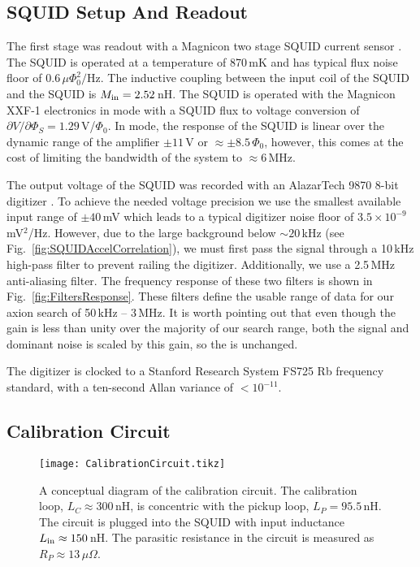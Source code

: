 \documentclass[aps,prd,amsmath,amssymb,reprint,superscriptaddress, nofootinbib,
]{revtex4-1}
\begin{document}
\subsection{SQUID Setup And Readout}
\label{sec:SQUIDReadout}


The first stage was readout with a Magnicon two stage SQUID current sensor \cite{Magnicon,Drung2007}. The SQUID is operated at a temperature of 870\,mK and has typical flux noise floor of $0.6\,\mu\Phi_0^2/\mathrm{Hz}$. The inductive coupling between the input coil of the SQUID and the SQUID is $M_{\rm in} = 2.52$\,nH. The SQUID is operated with the Magnicon XXF-1 electronics in \FLL mode with a SQUID flux to voltage conversion of $\partial V/\partial \Phi_S = 1.29$\,V/$\Phi_0$. In \FLL mode, the response of the SQUID is linear over the dynamic range of the amplifier $\pm11$\,V or $\approx\pm8.5\,\Phi_0$, however, this comes at the cost of limiting the bandwidth of the system to $\approx6$\,MHz. 

The output voltage of the SQUID was recorded with an AlazarTech 9870 8-bit digitizer \cite{AlazarTech}. To achieve the needed voltage precision we use the smallest available input range of $\pm40$\,mV which leads to a typical digitizer noise floor of $3.5\times10^{-9}$\,mV$^2$/Hz. However, due to the large background below $\sim20$\,kHz (see Fig.~\ref{fig:SQUIDAccelCorrelation}), we must first pass the signal through a 10\,kHz high-pass filter to prevent railing the digitizer. Additionally, we use a 2.5\,MHz anti-aliasing filter. The frequency response of these two filters is shown in Fig.~\ref{fig:FiltersResponse}. These filters define the usable range of data for our axion search of 50\,kHz -- 3\,MHz. It is worth pointing out that even though the gain is less than unity over the majority of our search range, both the signal and dominant noise is scaled by this gain, so the \SNR is unchanged. 

The digitizer is clocked to a Stanford Research System FS725 Rb frequency standard, with a ten-second Allan variance of $<10^{-11}$.

\subsection{Calibration Circuit}
\label{sec:CalibrationLoop}

\begin{figure}
\texttt{[image: CalibrationCircuit.tikz]}
\caption{A conceptual diagram of the \abra calibration circuit. The calibration loop, $L_C\approx300$\,nH, is concentric with the pickup loop, $L_P=95.5$\,nH. The circuit is plugged into the SQUID with input inductance $L_{\rm in}\approx150$\,nH. The parasitic resistance in the circuit is measured as $R_P\approx13\,\mu\Omega$.}
\label{fig:CalibrationCircuit}
\end{figure}
\end{document}
